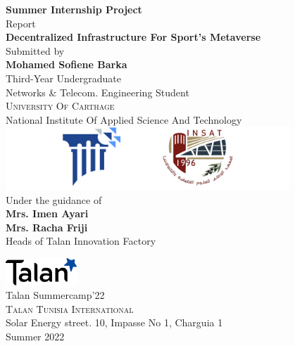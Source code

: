 \begin{titlepage}

    \begin{center}
    
    \textup{\small {\bf Summer Internship Project} \\ Report}\\[0.3in]
    
    \Large \textbf {
        Decentralized Infrastructure For Sport's Metaverse
    }\\[0.7in]
    
    
    \normalsize Submitted by \\[0.2in]
    \textbf{Mohamed Sofiene Barka}\\
    Third-Year Undergraduate\\ 
    Networks \& Telecom.  Engineering Student\\
    \bigskip
    \textsc{University Of Carthage}\\
    National Institute Of Applied Science And Technology\\
    \bigskip
    \includegraphics[width=0.8\textwidth]{assets/insat.png}\\[0.1in]
    
    \vspace{.2in}
    Under the guidance of\\[0.2in]
    \textbf{Mrs. Imen Ayari}\\
    \textbf{Mrs. Racha Friji}\\
    Heads of Talan Innovation Factory
    
    \vspace{.3in}
    
    \includegraphics[width=0.2\textwidth]{assets/talan.png}\\[0.1in]
    \Large{Talan Summercamp'22}\\
    \normalsize
    \textsc{Talan Tunisia International}\\
    Solar Energy street. 10, Impasse No 1, Charguia 1 \\
    \vspace{0.2cm}
    Summer 2022
    
    \end{center}
    
    \end{titlepage}
    